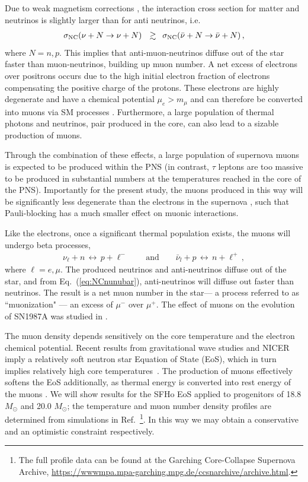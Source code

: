 \documentclass[11pt]{article}
\newcommand{\bea}{\begin{eqnarray}} \newcommand{\eea}{\end{eqnarray}}
\begin{document}
Due to weak magnetism corrections \cite{Horowitz:2001xf}, the interaction cross section for matter and neutrinos is slightly larger than for anti neutrinos, i.e.
\bea
\label{eq:NCnunubar}
\sigma_{\rm NC} (\nu + N \rightarrow \nu + N)  \,\,\,\, \gtrsim  \,\,\, \sigma_{\rm NC} (\bar{\nu} + N \rightarrow \bar{\nu} + N) \,,  
\eea
where $N = n, p$.   This implies that anti-muon-neutrinos diffuse out of the star faster than muon-neutrinos, building up muon number. A net excess of electrons over positrons occurs due to the high initial electron fraction of electrons compensating the positive charge of the protons. These electrons are highly degenerate and have a chemical potential $\mu_e > m_\mu$ and can therefore be converted into muons via SM processes \cite{Bollig:2017lki}. 
Furthermore, a large population of thermal photons and neutrinos, pair produced in the core, can also lead to a sizable production of muons.

Through the combination of these effects, a large population of supernova muons is expected to be produced within the PNS (in contrast, $\tau$ leptons are too massive to be produced in substantial numbers at the temperatures reached in the core of the PNS). Importantly for the present study, the muons produced in this way will be significantly less degenerate than the electrons in the supernova \cite{Bollig:2020xdr}, such that Pauli-blocking has a much smaller effect on muonic interactions.


Like the electrons, once a significant thermal population exists, the muons will undergo beta processes, \bea
\nu_\ell + n \, \longleftrightarrow \, p + \ell^- \,\qquad \text{and} \qquad \bar{\nu}_l + p \, \longleftrightarrow \, n + \ell^+ \,,
\eea
where $\ell = e, \mu$. The produced neutrinos and anti-neutrinos diffuse out of the star, and from Eq.~(\ref{eq:NCnunubar}), anti-neutrinos will diffuse out faster than neutrinos. The result is a net muon number in the star--- a process referred to as ``muonization" --- an excess of $\mu^-$ over $\mu^+$. The effect of muons on the evolution of SN1987A  was studied in \cite{Bollig:2017lki}.

The muon density depends sensitively on the core temperature and the electron chemical potential. Recent results from gravitational wave studies \cite{Abbott:2018exr} and NICER \cite{Bogdanov:2019ixe,Bogdanov:2019qjb} imply a relatively soft neutron star Equation of State (EoS), which in turn implies relatively high core temperatures~\cite{Bollig:2020xdr}. The production of muons effectively softens the EoS additionally, as thermal energy is converted into rest energy of the muons \cite{Bollig:2017lki}. We will show results for the SFHo EoS \cite{Steiner:2012rk} applied to progenitors of 18.8 $M_\odot$ and 20.0 $M_\odot$; the temperature and muon number density profiles are determined from simulations in Ref.~\cite{Bollig:2020xdr}\footnote{The full profile data can be found at the Garching Core-Collapse Supernova Archive, \url{https://wwwmpa.mpa-garching.mpg.de/ccsnarchive/archive.html}.}. In this way we may obtain a conservative and an optimistic constraint respectively.
\end{document}
